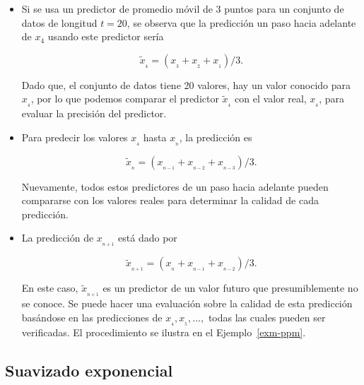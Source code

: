 \documentclass[
  us-letterpaper,
]{scrreprt}
\theoremstyle{plain}
\theoremstyle{definition}
\theoremstyle{definition}
\theoremstyle{plain}
\theoremstyle{remark}
\begin{document}
\begin{tcolorbox}[enhanced jigsaw, bottomtitle=1mm, coltitle=black, breakable, leftrule=.75mm, left=2mm, rightrule=.15mm, titlerule=0mm, toprule=.15mm, toptitle=1mm, colback=white, colframe=quarto-callout-caution-color-frame, title={Ejemplos}, colbacktitle=quarto-callout-caution-color!10!white, arc=.35mm, bottomrule=.15mm, opacitybacktitle=0.6, opacityback=0]

\begin{itemize}
\item
  Si se usa un predictor de promedio móvil de 3 puntos para un conjunto
  de datos de longitud \(t=20\), se observa que la predicción un paso
  hacia adelante de \(x_4\) usando este predictor sería

  \[
  \tilde{x}_{_4}=(x_{_3}+x_{_2}+x_{_1})/3.
  \]

  Dado que, el conjunto de datos tiene 20 valores, hay un valor conocido
  para \(x_{_4}\), por lo que podemos comparar el predictor
  \(\tilde{x}_{_4}\) con el valor real, \(x_{_4}\), para evaluar la
  precisión del predictor.
\item
  Para predecir los valores \(x_{_4}\) hasta \(x_{_n}\), la predicción
  es

  \[
  \tilde{x}_{_n}=(x_{_{n-1}}+x_{_{n-2}}+x_{_{n-3}})/3.
  \]

  Nuevamente, todos estos predictores de un paso hacia adelante pueden
  compararse con los valores reales para determinar la calidad de cada
  predicción.
\item
  La predicción de \(x_{_{n+1}}\) está dado por

  \[
  \tilde{x}_{_{n+1}}= (x_{_n}+x_{_{n-1}}+x_{_{n-2}})/3.
  \]

  En este caso, \(\tilde{x}_{_{n+1}}\) es un predictor de un valor
  futuro que presumiblemente no se conoce. Se puede hacer una evaluación
  sobre la calidad de esta predicción basándose en las predicciones de
  \(x_{_4},x_{_5},\ldots,\) todas las cuales pueden ser verificadas. El
  procedimiento se ilustra en el Ejemplo~\ref{exm-ppm}.
\end{itemize}

\end{tcolorbox}

\subsection{Suavizado exponencial}\label{suavizado-exponencial}
\end{document}
